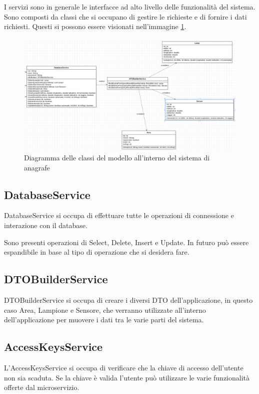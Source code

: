 I servizi sono in generale le interfacce ad alto livello delle funzionalità del sistema. Sono composti da classi che si occupano di gestire le richieste e di fornire i dati richiesti.
Questi si possono essere visionati nell'immagine \ref{fig:services_anagrafe}.

\begin{figure}[h]
    \centering
    \includegraphics[width=\textwidth]{img/services_anagrafe.png}
    \caption{Diagramma delle classi del modello all'interno del sistema di anagrafe}
    \label{fig:services_anagrafe}
\end{figure}

\subsection{DatabaseService}

DatabaseService si occupa di effettuare tutte le operazioni di connessione e interazione con il database. 

Sono presenti operazioni di Select, Delete, Insert e Update. In futuro può essere espandibile in base al tipo di operazione che si desidera fare.

\subsection{DTOBuilderService}
DTOBuilderService si occupa di creare i diversi DTO dell'applicazione, in questo caso Area, Lampione e Sensore, che verranno utilizzate all'interno dell'applicazione per muovere i dati tra le varie parti del sistema.

\subsection{AccessKeysService}
L'AccessKeysService si occupa di verificare che la chiave di accesso dell'utente non sia scaduta. Se la chiave è valida l'utente può utilizzare le varie funzionalità offerte dal microservizio.

